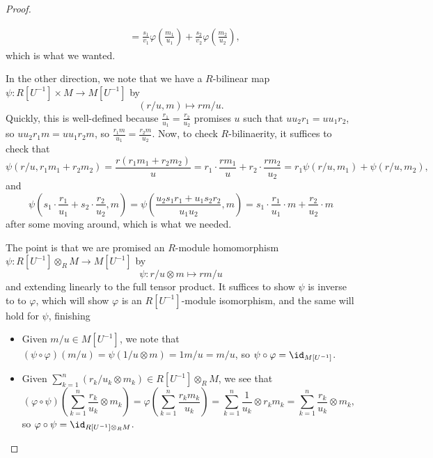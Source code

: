 \begin{proof}
\begin{itemize}
\begin{align*}
			&= \frac{s_1}{v_1}\varphi\left(\frac{m_1}{u_1}\right)+\frac{s_2}{v_2}\varphi\left(\frac{m_2}{u_2}\right),
		\end{align*}
		which is what we wanted.
	\end{itemize}
	In the other direction, we note that we have a $R$-bilinear map $\psi:R\left[U^{-1}\right]\times M\to M\left[U^{-1}\right]$ by
	\[(r/u,m)\mapsto rm/u.\]
	Quickly, this is well-defined because $\frac{r_1}{u_1}=\frac{r_2}{u_2}$ promises $u$ such that $uu_2r_1=uu_1r_2$, so $uu_2r_1m=uu_1r_2m$, so $\frac{r_1m}{u_1}=\frac{r_2m}{u_2}$. Now, to check $R$-bilinaerity, it suffices to check that
	\[\psi(r/u,r_1m_1+r_2m_2)=\frac{r(r_1m_1+r_2m_2)}u=r_1\cdot\frac{rm_1}u+r_2\cdot\frac{rm_2}{u_2}=r_1\psi(r/u,m_1)+\psi(r/u,m_2),\]
	and
	\[\psi\left(s_1\cdot\frac{r_1}{u_1}+s_2\cdot\frac{r_2}{u_2},m\right)=\psi\left(\frac{u_2s_1r_1+u_1s_2r_2}{u_1u_2},m\right)=s_1\cdot\frac{r_1}{u_1}\cdot m+\frac{r_2}{u_2}\cdot m\]
	after some moving around, which is what we needed.

	The point is that we are promised an $R$-module homomorphism $\psi:R\left[U^{-1}\right]\otimes_RM\to M\left[U^{-1}\right]$ by
	\[\boxed{\psi:r/u\otimes m\mapsto rm/u}\]
	and extending linearly to the full tensor product. It suffices to show $\psi$ is inverse to to $\varphi$, which will show $\varphi$ is an $R\left[U^{-1}\right]$-module isomorphism, and the same will hold for $\psi$, finishing
	\begin{itemize}
		\item Given $m/u\in M\left[U^{-1}\right]$, we note that $(\psi\circ\varphi)(m/u)=\psi(1/u\otimes m)=1m/u=m/u$, so $\psi\circ\varphi=\id_{M\left[U^{-1}\right]}$.
		\item Given $\sum_{k=1}^n(r_k/u_k\otimes m_k)\in R\left[U^{-1}\right]\otimes_RM$, we see that
		\[(\varphi\circ\psi)\left(\sum_{k=1}^n\frac{r_k}{u_k}\otimes m_k\right)=\varphi\left(\sum_{k=1}^n\frac{r_km_k}{u_k}\right)=\sum_{k=1}^n\frac1{u_k}\otimes r_km_k=\sum_{k=1}^n\frac{r_k}{u_k}\otimes m_k,\]
		so $\varphi\circ\psi=\id_{R\left[U^{-1}\right]\otimes_RM}$.
		\qedhere
	\end{itemize}
\end{proof}
